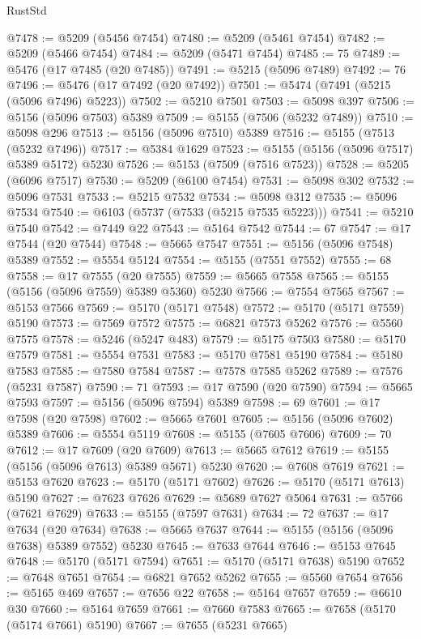 \begin{lexlean}{RustStd}
\begin{coremodule}
@7478 := @5209 (@5456 @7454)
@7480 := @5209 (@5461 @7454)
@7482 := @5209 (@5466 @7454)
@7484 := @5209 (@5471 @7454)
@7485 := 75
@7489 := @5476 (@17 @7485 (@20 @7485))
@7491 := @5215 (@5096 @7489)
@7492 := 76
@7496 := @5476 (@17 @7492 (@20 @7492))
@7501 := @5474 (@7491 (@5215 (@5096 @7496) @5223))
@7502 := @5210 @7501
@7503 := @5098 @397
@7506 := @5156 (@5096 @7503) @5389
@7509 := @5155 (@7506 (@5232 @7489))
@7510 := @5098 @296
@7513 := @5156 (@5096 @7510) @5389
@7516 := @5155 (@7513 (@5232 @7496))
@7517 := @5384 @1629
@7523 := @5155 (@5156 (@5096 @7517) @5389 @5172) @5230
@7526 := @5153 (@7509 (@7516 @7523))
@7528 := @5205 (@6096 @7517)
@7530 := @5209 (@6100 @7454)
@7531 := @5098 @302
@7532 := @5096 @7531
@7533 := @5215 @7532
@7534 := @5098 @312
@7535 := @5096 @7534
@7540 := @6103 (@5737 (@7533 (@5215 @7535 @5223)))
@7541 := @5210 @7540
@7542 := @7449 @22
@7543 := @5164 @7542
@7544 := 67
@7547 := @17 @7544 (@20 @7544)
@7548 := @5665 @7547
@7551 := @5156 (@5096 @7548) @5389
@7552 := @5554 @5124
@7554 := @5155 (@7551 @7552)
@7555 := 68
@7558 := @17 @7555 (@20 @7555)
@7559 := @5665 @7558
@7565 := @5155 (@5156 (@5096 @7559) @5389 @5360) @5230
@7566 := @7554 @7565
@7567 := @5153 @7566
@7569 := @5170 (@5171 @7548)
@7572 := @5170 (@5171 @7559) @5190
@7573 := @7569 @7572
@7575 := @6821 @7573 @5262
@7576 := @5560 @7575
@7578 := @5246 (@5247 @483)
@7579 := @5175 @7503
@7580 := @5170 @7579
@7581 := @5554 @7531
@7583 := @5170 @7581 @5190
@7584 := @5180 @7583
@7585 := @7580 @7584
@7587 := @7578 @7585 @5262
@7589 := @7576 (@5231 @7587)
@7590 := 71
@7593 := @17 @7590 (@20 @7590)
@7594 := @5665 @7593
@7597 := @5156 (@5096 @7594) @5389
@7598 := 69
@7601 := @17 @7598 (@20 @7598)
@7602 := @5665 @7601
@7605 := @5156 (@5096 @7602) @5389
@7606 := @5554 @5119
@7608 := @5155 (@7605 @7606)
@7609 := 70
@7612 := @17 @7609 (@20 @7609)
@7613 := @5665 @7612
@7619 := @5155 (@5156 (@5096 @7613) @5389 @5671) @5230
@7620 := @7608 @7619
@7621 := @5153 @7620
@7623 := @5170 (@5171 @7602)
@7626 := @5170 (@5171 @7613) @5190
@7627 := @7623 @7626
@7629 := @5689 @7627 @5064
@7631 := @5766 (@7621 @7629)
@7633 := @5155 (@7597 @7631)
@7634 := 72
@7637 := @17 @7634 (@20 @7634)
@7638 := @5665 @7637
@7644 := @5155 (@5156 (@5096 @7638) @5389 @7552) @5230
@7645 := @7633 @7644
@7646 := @5153 @7645
@7648 := @5170 (@5171 @7594)
@7651 := @5170 (@5171 @7638) @5190
@7652 := @7648 @7651
@7654 := @6821 @7652 @5262
@7655 := @5560 @7654
@7656 := @5165 @469
@7657 := @7656 @22
@7658 := @5164 @7657
@7659 := @6610 @30
@7660 := @5164 @7659
@7661 := @7660 @7583
@7665 := @7658 (@5170 (@5174 @7661) @5190)
@7667 := @7655 (@5231 @7665)

\end{coremodule}
\end{lexlean}
